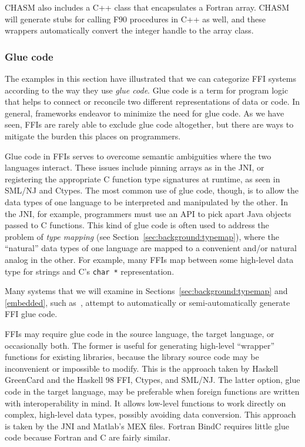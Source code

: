 CHASM also includes a C++ class that encapsulates a Fortran array.
CHASM will generate stubs for calling F90 procedures in C++ as
well, and these wrappers automatically convert the integer handle
to the array class.



\subsubsection{Glue code}
\label{sec:ffi:glue-code}

The examples in this section have illustrated that we can
categorize FFI systems according to the way they use \emph{glue
code}. Glue code is a term for program logic that helps to connect
or reconcile two different representations of data or code. In
general, frameworks endeavor to minimize the need for glue code.
As we have seen, FFIs are rarely able to exclude glue code
altogether, but there are ways to mitigate the burden this places
on programmers.

Glue code in FFIs serves to overcome semantic ambiguities where
the two languages interact. These issues include pinning arrays as
in the JNI, or registering the appropriate C function type
signatures at runtime, as seen in SML/NJ and Ctypes. The most
common use of glue code, though, is to allow the data types of one
language to be interpreted and manipulated by the other. In the
JNI, for example, programmers must use an API to pick apart Java
objects passed to C functions. This kind of glue code is often
used to address the problem of \emph{type mapping} (see
Section~\ref{sec:background:typemap}), where the ``natural'' data
types of one language are mapped to a convenient and/or natural
analog in the other. For example, many FFIs map between some
high-level data type for strings and C's \texttt{char *}
representation.

Many systems that we will examine in
Sections~\ref{sec:background:typemap} and \ref{embedded}, such
as~\cite{hirzel07jeannie}, attempt to automatically or
semi-automatically generate FFI glue code.

FFIs may require glue code in the source language, the target
language, or occasionally both. The former is useful for
generating high-level ``wrapper'' functions for existing
libraries, because the library source code may be inconvenient or
impossible to modify. This is the approach taken by Haskell
GreenCard and the Haskell 98 FFI, Ctypes, and SML/NJ. The latter
option, glue code in the target language, may be preferable when
foreign functions are written with interoperability in mind. It
allows low-level functions to work directly on complex, high-level
data types, possibly avoiding data conversion. This approach is
taken by the JNI and Matlab's MEX files. Fortran BindC requires
little glue code because Fortran and C are fairly similar.

